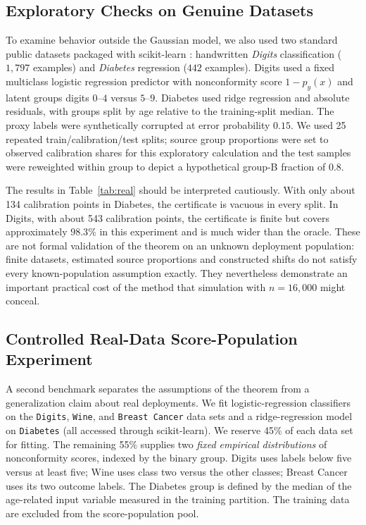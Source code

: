 \documentclass[twoside,11pt]{article}
\begin{document}
\subsection{Exploratory Checks on Genuine Datasets}
To examine behavior outside the Gaussian model, we also used two standard public datasets packaged with scikit-learn \citep{pedregosa2011}: handwritten \emph{Digits} classification ($1{,}797$ examples) and \emph{Diabetes} regression ($442$ examples). Digits used a fixed multiclass logistic regression predictor with nonconformity score $1-\widehat p_y(x)$ and latent groups digits $0$--$4$ versus $5$--$9$. Diabetes used ridge regression and absolute residuals, with groups split by age relative to the training-split median. The proxy labels were synthetically corrupted at error probability $0.15$. We used 25 repeated train/calibration/test splits; source group proportions were set to observed calibration shares for this exploratory calculation and the test samples were reweighted within group to depict a hypothetical group-B fraction of $0.8$.

The results in Table~\ref{tab:real} should be interpreted cautiously. With only about 134 calibration points in Diabetes, the certificate is vacuous in every split. In Digits, with about 543 calibration points, the certificate is finite but covers approximately $98.3\%$ in this experiment and is much wider than the oracle. These are not formal validation of the theorem on an unknown deployment population: finite datasets, estimated source proportions and constructed shifts do not satisfy every known-population assumption exactly. They nevertheless demonstrate an important practical cost of the method that simulation with $n=16{,}000$ might conceal.
\begin{table}[t]
\centering\small
\caption{Exploratory real-dataset checks at hypothetical target group-B share $0.8$, 25 repeated splits, proxy error $0.15$. Vacuous means $q=+\infty$, for which the displayed empirical coverage is one. Source proportions are estimated in this illustration and thus are outside the exact known-prior theorem.}\label{tab:real}
\end{table}

\subsection{Controlled Real-Data Score-Population Experiment}
A second benchmark separates the assumptions of the theorem from a generalization claim about real deployments. We fit logistic-regression classifiers on the \texttt{Digits}, \texttt{Wine}, and \texttt{Breast Cancer} data sets and a ridge-regression model on \texttt{Diabetes} (all accessed through scikit-learn). We reserve 45\% of each data set for fitting. The remaining 55\% supplies two \emph{fixed empirical distributions} of nonconformity scores, indexed by the binary group. Digits uses labels below five versus at least five; Wine uses class two versus the other classes; Breast Cancer uses its two outcome labels. The Diabetes group is defined by the median of the age-related input variable measured in the training partition. The training data are excluded from the score-population pool.
\end{document}

